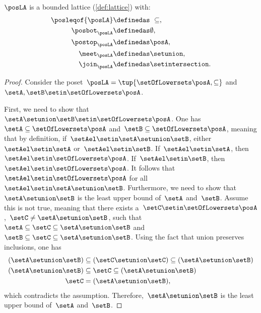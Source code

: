 \begin{lemma}
    $\posLA$ is a bounded lattice (\cref{def:lattice}) with:
    \begin{equation}
        \begin{aligned}
            \posleqof{\posLA} & \definedas \ \subseteq, \\
            \posbot_{\posLA}  & \definedas \emptyset, \\
            \postop_{\posLA}  & \definedas \posA, \\
            \meet_{\posLA}    & \definedas \setunion, \\
            \join_{\posLA}    & \definedas \setintersection.
        \end{aligned}
    \end{equation}
\end{lemma}
\begin{proof}
    Consider the poset~$\posLA=\tup{\setOfLowersets \posA,\subseteq}$ and~$\setA,\setB\setin \setOfLowersets \posA$.

    First, we need to show that~$\setA\setunion \setB\setin \setOfLowersets \posA$.
    One has~$\setA \subseteq \setOfLowersets \posA$ and~$\setB\subseteq \setOfLowersets \posA$, meaning that by definition, if~$\setAel\setin \setA\setunion \setB$, either~$\setAel\setin \setA$ or~$\setAel\setin \setB$.
    If~$\setAel\setin \setA$, then~$\setAel\setin \setOfLowersets \posA$.
    If~$\setAel\setin \setB$, then~$\setAel\setin \setOfLowersets \posA$.
    It follows that~$\setAel\setin \setOfLowersets \posA$ for all~$\setAel\setin \setA\setunion \setB$.
    Furthermore, we need to show that~$\setA\setunion \setB$ is the least upper bound of~$\setA$ and~$\setB$.
    Assume this is not true, meaning that there exists a~$\setC\setin \setOfLowersets \posA$,~$\setC\neq \setA\setunion \setB$, such that~$\setA\subseteq \setC\subseteq \setA\setunion \setB$ and~$\setB\subseteq \setC\subseteq \setA\setunion \setB$.
    Using the fact that union preserves inclusions, one has
    \begin{equation}
        \begin{aligned}
            (\setA\setunion \setB)
                                   & \subseteq (\setC\setunion \setC) \subseteq (\setA\setunion \setB) \\
            (\setA\setunion \setB) & \subseteq \setC \subseteq (\setA\setunion \setB) \\
            \setC                  & = (\setA\setunion \setB),
        \end{aligned}
    \end{equation}
    which contradicts the assumption.
    Therefore,~$\setA\setunion \setB$ is the least upper bound of~$\setA$ and~$\setB$.


\end{proof}
